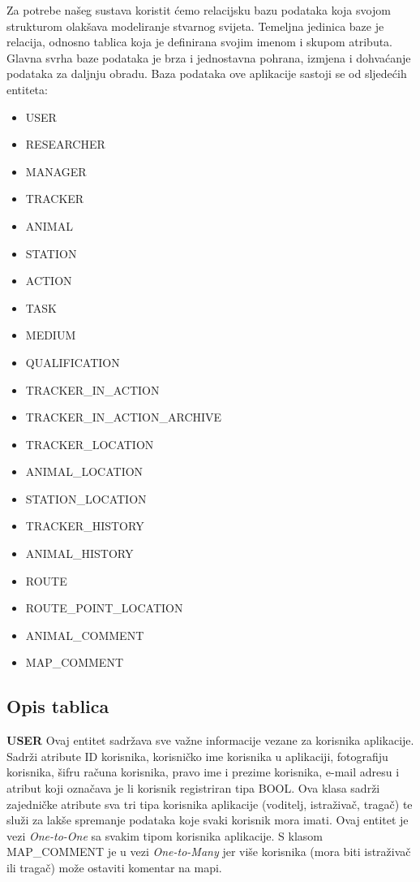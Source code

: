 				\noindent Za potrebe našeg sustava koristit ćemo relacijsku bazu podataka koja svojom strukturom olakšava modeliranje stvarnog svijeta. Temeljna jedinica baze je relacija, odnosno tablica koja je definirana svojim imenom i skupom atributa. Glavna svrha baze podataka je brza i jednostavna pohrana, izmjena i dohvaćanje podataka za daljnju obradu. Baza podataka ove aplikacije sastoji se od sljedećih entiteta:
				
				\begin{itemize}
					\item USER
					\item RESEARCHER
					\item MANAGER
					\item TRACKER
					\item ANIMAL
					\item STATION
					\item ACTION
					\item TASK
					\item MEDIUM
					\item QUALIFICATION
					\item TRACKER\_IN\_ACTION
					\item TRACKER\_IN\_ACTION\_ARCHIVE
					\item TRACKER\_LOCATION
					\item ANIMAL\_LOCATION
					\item STATION\_LOCATION
					\item TRACKER\_HISTORY
					\item ANIMAL\_HISTORY
					\item ROUTE
					\item ROUTE\_POINT\_LOCATION
					\item ANIMAL\_COMMENT
					\item MAP\_COMMENT
				\end{itemize}
				
		\subsection{Opis tablica}
				
				
				\noindent \textbf{USER} \hspace{1em} Ovaj entitet sadržava sve važne informacije vezane za korisnika aplikacije. Sadrži atribute ID korisnika, korisničko ime korisnika u aplikaciji, fotografiju korisnika, šifru računa korisnika, pravo ime i prezime korisnika, e-mail adresu i atribut koji označava je li korisnik registriran tipa BOOL.  Ova klasa sadrži zajedničke atribute sva tri tipa korisnika aplikacije (voditelj, istraživač, tragač) te služi za lakše spremanje podataka koje svaki korisnik mora imati. Ovaj entitet je  vezi \textit{One-to-One} sa svakim tipom korisnika aplikacije. S klasom MAP\_COMMENT je u vezi \textit{One-to-Many} jer više korisnika (mora biti istraživač ili tragač) može ostaviti komentar na mapi.
				
